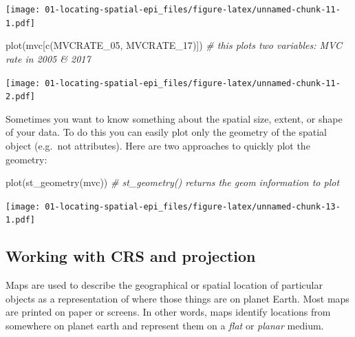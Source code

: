 \documentclass[
]{book}
\newenvironment{Shaded}{\begin{snugshade}}{\end{snugshade}}
\newcommand{\CommentTok}[1]{\textcolor[rgb]{0.56,0.35,0.01}{\textit{#1}}}
\newcommand{\FunctionTok}[1]{\textcolor[rgb]{0.00,0.00,0.00}{#1}}
\newcommand{\NormalTok}[1]{#1}
\newcommand{\SpecialCharTok}[1]{\textcolor[rgb]{0.00,0.00,0.00}{#1}}
\newcommand{\StringTok}[1]{\textcolor[rgb]{0.31,0.60,0.02}{#1}}
\begin{document}
\texttt{[image: 01-locating-spatial-epi\_files/figure-latex/unnamed-chunk-11-1.pdf]}

\begin{Shaded}
\begin{Highlighting}[]
\FunctionTok{plot}\NormalTok{(mvc[}\FunctionTok{c}\NormalTok{(}\StringTok{\textquotesingle{}MVCRATE\_05\textquotesingle{}}\NormalTok{, }\StringTok{\textquotesingle{}MVCRATE\_17\textquotesingle{}}\NormalTok{)]) }\CommentTok{\# this plots two variables: MVC rate in 2005 \& 2017}
\end{Highlighting}
\end{Shaded}

\texttt{[image: 01-locating-spatial-epi\_files/figure-latex/unnamed-chunk-11-2.pdf]}

Sometimes you want to know something about the spatial size, extent, or shape of your data. To do this you can easily plot only the geometry of the spatial object (e.g.~not attributes). Here are two approaches to quickly plot the geometry:

\begin{Shaded}
\begin{Highlighting}[]
\FunctionTok{plot}\NormalTok{(}\FunctionTok{st\_geometry}\NormalTok{(mvc)) }\CommentTok{\# st\_geometry() returns the geom information to plot}
\end{Highlighting}
\end{Shaded}

\begin{Shaded}
\end{Shaded}

\texttt{[image: 01-locating-spatial-epi\_files/figure-latex/unnamed-chunk-13-1.pdf]}

\hypertarget{working-with-crs-and-projection}{%
\subsection{Working with CRS and projection}\label{working-with-crs-and-projection}}

Maps are used to describe the geographical or spatial location of particular objects as a representation of where those things are on planet Earth. Most maps are printed on paper or screens. In other words, maps identify locations from somewhere on planet earth and represent them on a \emph{flat} or \emph{planar} medium.
\end{document}
